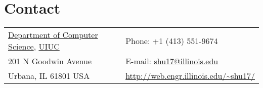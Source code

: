 \section{\sc Contact}
\vspace{.01in}
\begin{tabular}{@{}p{3.6in}p{4in}}
{\href{http://www.cs.illinois.edu/}{Department of Computer Science}, \href{http://www.illinois.edu/}{UIUC}}     & {Phone:}  +1 (413) 551-9674 \\
{201 N Goodwin Avenue}  																																												& {E-mail:} {\href{mailto:shu17@illinois.edu}{shu17@illinois.edu}}\\
Urbana, IL 61801 USA                                                          																	& {\url{http://web.engr.illinois.edu/~shu17/}}\\
\end{tabular}



